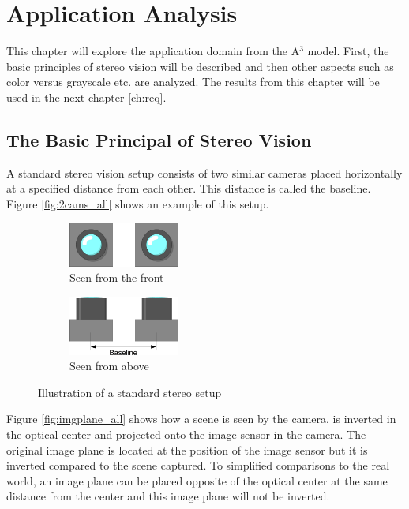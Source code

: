 \chapter{Application Analysis} \label{ch:appanalysis}
This chapter will explore the application domain from the A$^3$ model. First, the basic principles of stereo vision will be described and then other aspects such as color versus grayscale etc. are analyzed. The results from this chapter will be used in the next chapter \vref{ch:req}.

\section{The Basic Principal of Stereo Vision}\label{sec:basicstereo}
A standard stereo vision setup consists of two similar cameras placed horizontally at a specified distance from each other. This distance is called the baseline. Figure \vref{fig:2cams_all} shows an example of this setup.\\
\begin{figure}[ht!]
  \centering
  \begin{subfigure}[t]{1\textwidth}
    \centering\includegraphics[width=0.4\textwidth]{figures/2cams_fro}
    \caption{Seen from the front\label{fig:2cams_fro}}
  \end{subfigure}\vspace{0.4cm}
  \begin{subfigure}[t]{1\textwidth}
    \centering\includegraphics[width=0.4\textwidth]{figures/2cams_top}
    \caption{Seen from above\label{fig:2cams_top}}
  \end{subfigure}
  \caption{Illustration of a standard stereo setup\label{fig:2cams_all}}
\end{figure}

Figure \vref{fig:imgplane_all} shows how a scene is seen by the camera, is inverted in the optical center and projected onto the image sensor in the camera. The original image plane is located at the position of the image sensor but it is inverted compared to the scene captured. To simplified comparisons to the real world, an image plane can be placed opposite of the optical center at the same distance from the center and this image plane will not be inverted.

